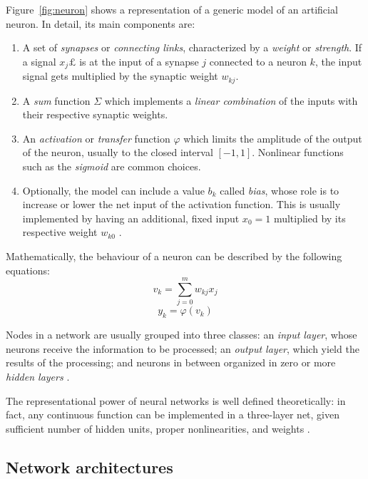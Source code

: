 \documentclass[11pt,a4paper]{report}
\begin{document}
			Figure~\ref{fig:neuron} shows a representation of a generic model of an artificial neuron. In detail, its main components are:
			\begin{enumerate}
				\item A set of \emph{synapses} or \emph{connecting links}, characterized by a \emph{weight} or \emph{strength}. If a signal $x_j£$ is at the input of a synapse $j$ connected to a neuron $k$, the input signal gets multiplied by the synaptic weight $w_{kj}$.
				\item A \emph{sum} function $\Sigma$ which implements a \emph{linear combination} of the inputs with their respective synaptic weights.
				\item An \emph{activation} or \emph{transfer} function $\varphi$ which limits the amplitude of the output of the neuron, usually to the closed interval $[-1, 1]$. Nonlinear functions such as the \emph{sigmoid} are common choices.
				\item Optionally, the model can include a value $b_k$ called \emph{bias}, whose role is to increase or lower the net input of the activation function. This is usually implemented by having an additional, fixed input $x_0 = 1$ multiplied by its respective weight $w_{k0}$ \cite{haykin2009neural}.
			\end{enumerate}
		
			Mathematically, the behaviour of a neuron can be described by the following equations:
			\begin{equation}
				v_k = \sum_{j=0}^{m} w_{kj}x_j
			\end{equation}
			\begin{equation}
				y_k = \varphi(v_k)
			\end{equation}
		
			Nodes in a network are usually grouped into three classes: an \emph{input layer}, whose neurons receive the information to be processed; an \emph{output layer}, which yield the results of the processing; and neurons in between organized in zero or more \emph{hidden layers} \cite{kotsiantis2007supervised}.
		
			The representational power of neural networks is well defined theoretically: in fact, any continuous function can be implemented in a three-layer net, given sufficient number of hidden units, proper nonlinearities, and weights \cite{hornik1989multilayer,kuurkova1992kolmogorov,lam2015prslides}.
		
			\subsection{Network architectures}
\end{document}
